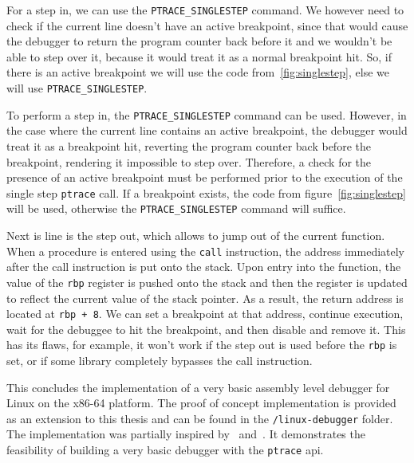 For a step in, we can use the \texttt{PTRACE\_SINGLESTEP} command. We
however need to check if the current line doesn't have an active breakpoint,
since that would cause the debugger to return the program counter back before
it and we wouldn't be able to step over it, because it would treat it as a
normal breakpoint hit. So, if there is an active breakpoint we will use the
code from~\ref{fig:singlestep}, else we will use \texttt{PTRACE\_SINGLESTEP}.

To perform a step in, the \verb|PTRACE_SINGLESTEP| command can be used.
However, in the case where the current line contains an active breakpoint, the
debugger would treat it as a breakpoint hit, reverting the program counter back
before the breakpoint, rendering it impossible to step over. Therefore, a check
for the presence of an active breakpoint must be performed prior to the
execution of the single step \texttt{ptrace} call. If a breakpoint exists, the
code from figure~\ref{fig:singlestep} will be used, otherwise the
\verb|PTRACE_SINGLESTEP| command will suffice.

Next is line is the step out, which allows to jump out of the current function.
When a procedure is entered using the \texttt{call} instruction, the address
immediately after the call instruction is put onto the stack. Upon entry into
the function, the value of the \texttt{rbp} register is pushed onto the stack
and then the register is updated to reflect the current value of the stack
pointer. As a result, the return address is located at \texttt{rbp + 8}. We can
set a breakpoint at that address, continue execution, wait for the debuggee to
hit the breakpoint, and then disable and remove it. This has its flaws, for
example, it won't work if the step out is used before the \texttt{rbp} is set,
or if some library completely bypasses the call instruction.

This concludes the implementation of a very basic assembly level debugger for
Linux on the x86-64 platform. The proof of concept implementation is provided
as an extension to this thesis and can be found in the \texttt{/linux-debugger}
folder. The implementation was partially inspired by~\cite{linux-debugger-blog}
and~\cite{lldb}. It demonstrates the feasibility of building a very basic
debugger with the \texttt{ptrace} api.

